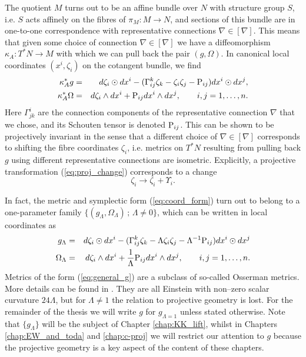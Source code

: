 \begin{rmk}
The quotient $M$ turns out to be an affine bundle over $N$ with
structure group $S$, i.e. $S$ acts affinely on the fibres of $\pi_M:M\rightarrow N$,
and sections of this bundle are in one-to-one correspondence with
representative connections $\nabla\in[\nabla]$. This means that given
some choice of connection $\nabla\in[\nabla]$ we have a diffeomorphism
$\kappa_A:T^{*}N\rightarrow M$ with which we can pull back the pair
$(g,\Omega)$. In canonical local coordinates $(x^{i},\zeta_{i})$ on
the cotangent bundle, we find
\begin{eqnarray}
\kappa_A^{*}g & = &  d\zeta_{i}\odot dx^{i}-(\Gamma_{ij}^{k}\zeta_{k}-\zeta_{i}\zeta_{j}-\mathrm{P}_{ij}) dx^{i}\odot dx^{j},\label{eq:coord_form}\\
\kappa_A^{*}\Omega & = &  d\zeta_{i}\wedge dx^{i}+\mathrm{P}_{ij} dx^{i}\wedge dx^{j},\qquad i,j=1,\dots ,n.\nonumber 
\end{eqnarray}
Here $\Gamma_{jk}^{i}$ are the connection components of the representative
connection $\nabla$ that we chose, and its Schouten tensor is denoted $\mathrm{P}_{ij}$. This can be shown to be projectively invariant
in the sense that a different choice of $\nabla\in[\nabla]$ corresponds
to shifting the fibre coordinates $\zeta_{i}$, i.e. metrics on $T^{*}N$
resulting from pulling back $g$ using different representative connections
are isometric. Explicitly, a projective transformation (\ref{eq:proj_change})
corresponds to a change
\begin{equation}
\zeta_{i}\longrightarrow \zeta_{i}+\Upsilon_{i}.\label{eq:zeta_change}
\end{equation}
\end{rmk}


\begin{rmk}
In fact, the metric and symplectic form (\ref{eq:coord_form}) turn
out to belong to a one-parameter family $\{(g_\Lambda,\Omega_\Lambda)\,;\,\Lambda\neq 0\}$, which
can be written in local coordinates as 
\begin{eqnarray}
g_{\Lambda} & = &  d\zeta_{i}\odot dx^{i}-(\Gamma_{ij}^{k}\zeta_{k}-\Lambda \zeta_{i}\zeta_{j}-\Lambda^{-1}\mathrm{P}_{ij}) dx^{i}\odot dx^{j}\label{eq:general_g}\\
\Omega_{\Lambda} & = &  d\zeta_{i}\wedge dx^{i}+\frac{1}{\Lambda}\mathrm{P}_{ij} dx^{i}\wedge dx^{j},\qquad i,j=1,\dots ,n.\label{eq:general_omega}
\end{eqnarray}
Metrics of the form (\ref{eq:general_g}) are a subclass of so-called
Osserman metrics. More details can be found in \cite{osserman}. They are all Einstein with non--zero scalar curvature $24\Lambda$, but for $\Lambda\neq1$ the relation to projective geometry is lost. For the remainder of the thesis we will write $g$ for $g_{\Lambda=1}$ unless stated otherwise. Note that $\{g_\Lambda\}$ will be the subject of Chapter \ref{chap:KK_lift}, whilst in Chapters  \ref{chap:EW_and_toda} and \ref{chap:c-proj} we will restrict our attention to $g$ because the projective geometry is a key aspect of the content of these chapters.
\end{rmk}



